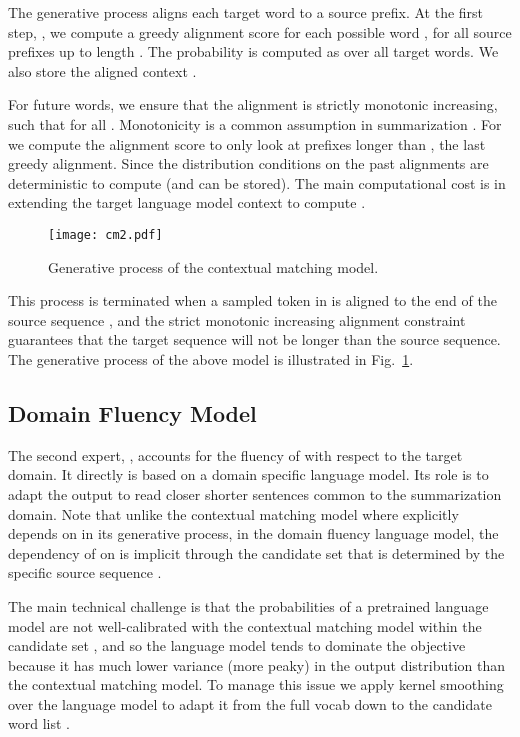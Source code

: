 \documentclass[11pt,a4paper]{article}
\begin{document}
\noindent
The generative process aligns each 
target word to a source prefix. At the first step, , we compute a greedy alignment score for each
possible word ,  for all source prefixes up to length . The probability  is computed as  over all target words. We also store the aligned context . 

For future words, we ensure that the alignment is strictly monotonic increasing, such that  for all . Monotonicity is a common assumption in summarization \cite{yu2016neural, yu2016online, raffel2017online}. For  we compute the alignment score  to only look at prefixes longer than , the last greedy alignment. Since the distribution conditions on  the past alignments are deterministic to compute (and can be stored). The main computational cost is in extending the target language model context to compute . 



\begin{figure}
    \centering
\texttt{[image: cm2.pdf]}
\caption{Generative process of the contextual matching model.}
    \label{fig:ps}
\end{figure}







This process is terminated when a sampled token in  is aligned to the end of the source sequence , and the strict monotonic increasing alignment constraint guarantees that the target sequence will not be longer than the source sequence. The generative process of the above model is illustrated in Fig.~\ref{fig:ps}.


\subsection{Domain Fluency Model}

The second expert, , accounts for the  fluency of  with respect to the target domain. It directly is based on a domain specific language model. Its role is to adapt the output to read closer shorter sentences common to the summarization domain. Note that unlike the contextual matching model where  explicitly depends on  in its generative process, in the domain fluency language model, the dependency of  on  is implicit through the candidate set  that is determined by the specific source sequence .

The main technical challenge is that the probabilities of a pretrained language model are not well-calibrated with the contextual matching model within the candidate set , and so the language model tends to dominate the objective because it has much lower variance (more peaky) in the output distribution than the contextual matching model. To manage this issue we apply kernel smoothing over the language model to adapt it from the full vocab  down to the candidate word list . 
\end{document}
